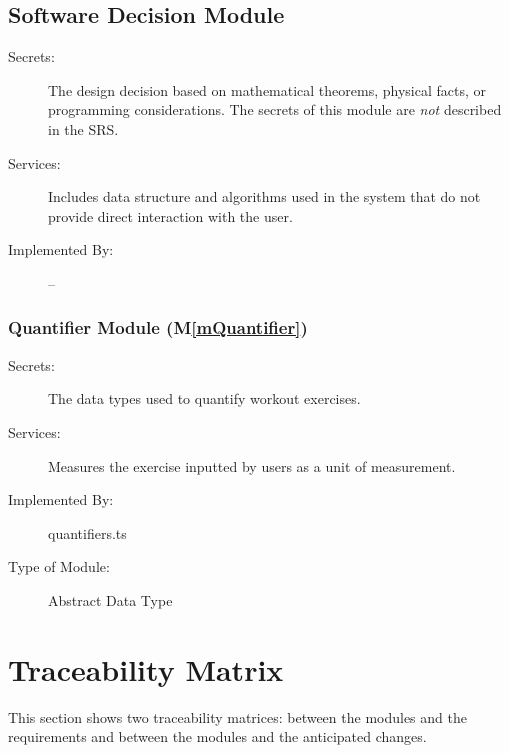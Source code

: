 \documentclass[12pt, titlepage]{article}
\newcommand{\mref}[1]{M\ref{#1}}
\begin{document}
\subsection{Software Decision Module}

\begin{description}
\item[Secrets:] The design decision based on mathematical theorems, physical
  facts, or programming considerations. The secrets of this module are
  \emph{not} described in the SRS.
\item[Services:] Includes data structure and algorithms used in the system that
  do not provide direct interaction with the user. 
\item[Implemented By:] --
\end{description}

\subsubsection{Quantifier Module (\mref{mQuantifier})}
\begin{description}
\item[Secrets:] The data types used to quantify workout exercises.
\item[Services:] Measures the exercise inputted by users as a unit of measurement.
\item[Implemented By:] quantifiers.ts
\item[Type of Module:] Abstract Data Type
\end{description}

\section{Traceability Matrix} \label{SecTM}

This section shows two traceability matrices: between the modules and the
requirements and between the modules and the anticipated changes.
\end{document}
